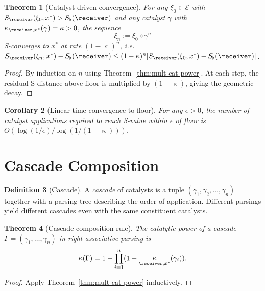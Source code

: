 \documentclass[11pt,a4paper]{article}
\theoremstyle{thmstyle}
\newtheorem{theorem}{Theorem}[section]
\newtheorem{corollary}[theorem]{Corollary}
\theoremstyle{thmstyle}
\theoremstyle{definition}
\newtheorem{definition}[theorem]{Definition}
\theoremstyle{remark}
\DeclareMathOperator{\catpow}{\kappa}
\newcommand{\Expr}{\mathcal{E}}
\newcommand{\Sscalar}{S}
\newcommand{\Sfloor}{S_{\flat}}
\begin{document}
\begin{theorem}[Catalyst-driven convergence]
\label{thm:cat-conv}
For any $\xi_{0} \in \Expr$ with
$\Sscalar_{\receiver}(\xi_{0}, x^{*}) >
\Sfloor(\receiver)$ and any catalyst $\gamma$ with
$\catpow_{\receiver, x^{*}}(\gamma) = \catpow > 0$,
the sequence
\[
\xi_{n} := \xi_{0} \diamond \gamma^{n}
\]
S-converges to $x^{*}$ at rate
$(1 - \catpow)^{n}$, i.e.\
$\Sscalar_{\receiver}(\xi_{n}, x^{*}) -
\Sfloor(\receiver) \leq (1 - \catpow)^{n}
[\Sscalar_{\receiver}(\xi_{0}, x^{*}) -
 \Sfloor(\receiver)]$.
\end{theorem}

\begin{proof}
By induction on $n$ using
Theorem~\ref{thm:mult-cat-power}.  At each step,
the residual S-distance above floor is multiplied
by $(1 - \catpow)$, giving the geometric decay.
\end{proof}

\begin{corollary}[Linear-time convergence to floor]
\label{cor:linear-conv}
For any $\epsilon > 0$, the number of catalyst
applications required to reach S-value within
$\epsilon$ of floor is
$O(\log(1/\epsilon) / \log(1/(1-\catpow)))$.
\end{corollary}

\section{Cascade Composition}
\label{sec:cascade-composition}

\begin{definition}[Cascade]\label{def:cascade}
A \emph{cascade} of catalysts is a tuple
$(\gamma_{1}, \gamma_{2}, \ldots, \gamma_{n})$
together with a parsing tree describing the order
of application.  Different parsings yield different
cascades even with the same constituent catalysts.
\end{definition}

\begin{theorem}[Cascade composition rule]
\label{thm:cascade-comp-rule}
The catalytic power of a cascade
$\Gamma = (\gamma_{1}, \ldots, \gamma_{n})$ in
right-associative parsing is
\[
\catpow(\Gamma) = 1 - \prod_{i=1}^{n}
   (1 - \catpow_{\receiver, x^{*}}(\gamma_{i})).
\]
\end{theorem}

\begin{proof}
Apply Theorem~\ref{thm:mult-cat-power}
inductively.
\end{proof}
\end{document}
